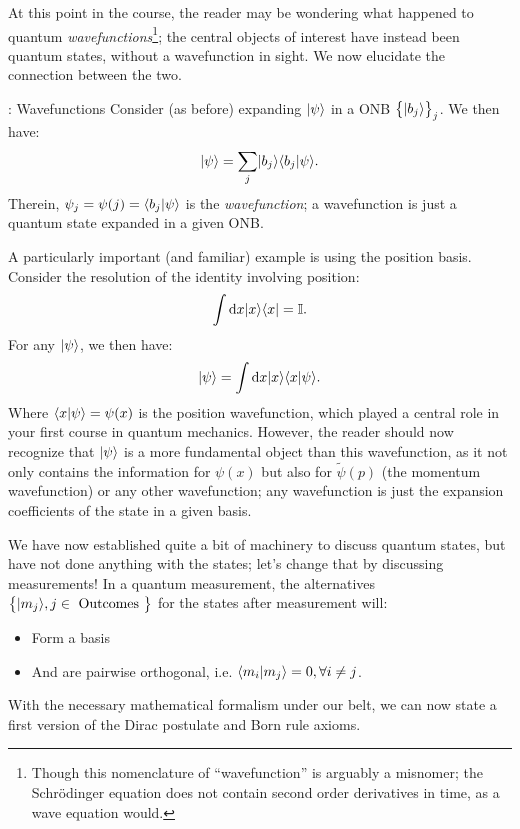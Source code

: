 At this point in the course, the reader may be wondering what happened to quantum \emph{wavefunctions}\footnote{Though this nomenclature of ``wavefunction'' is arguably a misnomer; the Schr\"{o}dinger equation does not contain second order derivatives in time, as a wave equation would.}; the central objects of interest have instead been quantum states, without a wavefunction in sight. We now elucidate the connection between the two.

\begin{defbox}{: Wavefunctions}
    Consider (as before) expanding $\lvert \psi \rangle$ in a ONB $\set{\lvert b_j \rangle}_j$. We then have:
    \begin{equation}
        \lvert \psi \rangle = \sum_j \lvert b_j \rangle\langle b_j \lvert \psi \rangle.
    \end{equation}
    Therein, $\psi_j = \psi(j) = \langle b_j \lvert \psi \rangle$ is the \emph{wavefunction}; a wavefunction is just a quantum state expanded in a given ONB. 
\end{defbox}

A particularly important (and familiar) example is using the position basis. Consider the resolution of the identity involving position:
\begin{equation}
    \int \mathrm d x \lvert x \rangle \langle x \rvert = \mathbb{I}.
\end{equation}
For any $\lvert \psi \rangle$, we then have:
\begin{equation}
    \lvert \psi \rangle = \int \mathrm d x \lvert x \rangle\langle x \lvert \psi \rangle.
\end{equation}
Where $\langle x \lvert \psi \rangle = \psi(x)$ is the position wavefunction, which played a central role in your first course in quantum mechanics. However, the reader should now recognize that $\lvert \psi \rangle$ is a more fundamental object than this wavefunction, as it not only contains the information for $\psi(x)$ but also for $\tilde{\psi}(p)$ (the momentum wavefunction) or any other wavefunction; any wavefunction is just the expansion coefficients of the state in a given basis.

We have now established quite a bit of machinery to discuss quantum states, but have not done anything with the states; let's change that by discussing measurements! In a quantum measurement, the alternatives $\set{\lvert m_j \rangle, j \in \text{ Outcomes }}$ for the states after measurement will:
\begin{itemize}
    \item Form a basis
    \item And are pairwise orthogonal, i.e. $\langle m_i \lvert m_j \rangle = 0, \forall i \neq j$. 
\end{itemize}
With the necessary mathematical formalism under our belt, we can now state a first version of the Dirac postulate and Born rule axioms.

